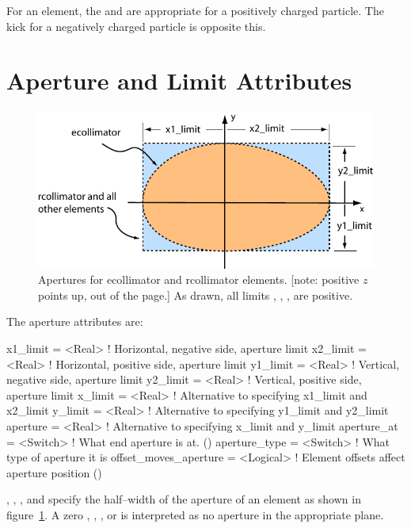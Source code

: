 For an  element, the  and  are
appropriate for a positively charged particle. The kick for a
negatively charged particle is opposite this.

\section{Aperture and Limit Attributes}
\label{s:limit}

\begin{figure}[ht]
  \centering
  \includegraphics{apertures.pdf}
  \caption[Apertures for ecollimator and rcollimator elements.]
  {Apertures for ecollimator and rcollimator elements. 
  [note: positive $z$ points up, out of the page.] 
  As drawn, all limits , , 
  ,  are  positive.}  
  \label{f:limit}
\end{figure}

The aperture attributes are:
\begin{example}
  x1_limit      = <Real>      ! Horizontal, negative side, aperture limit
  x2_limit      = <Real>      ! Horizontal, positive side, aperture limit
  y1_limit      = <Real>      ! Vertical, negative side, aperture limit
  y2_limit      = <Real>      ! Vertical, positive side, aperture limit
  x_limit       = <Real>      ! Alternative to specifying x1_limit and x2_limit
  y_limit       = <Real>      ! Alternative to specifying y1_limit and y2_limit
  aperture      = <Real>      ! Alternative to specifying x_limit and y_limit
  aperture_at   = <Switch>    ! What end aperture is at. ()
  aperture_type = <Switch>    ! What type of aperture it is
  offset_moves_aperture = <Logical> ! Element offsets affect aperture position ()
\end{example}
, , , and  specify
the half--width of the aperture of an element as shown in
figure~\ref{f:limit}. A zero , ,
, or  is interpreted as no aperture in the
appropriate plane.

